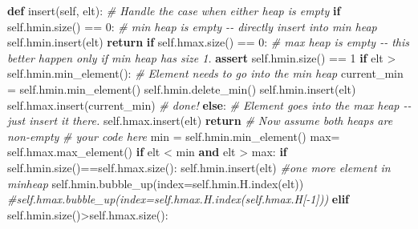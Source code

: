 \documentclass[
]{article}
\newenvironment{Shaded}{}{}
\newcommand{\BuiltInTok}[1]{\textcolor[rgb]{0.00,0.50,0.00}{#1}}
\newcommand{\CommentTok}[1]{\textcolor[rgb]{0.38,0.63,0.69}{\textit{#1}}}
\newcommand{\ControlFlowTok}[1]{\textcolor[rgb]{0.00,0.44,0.13}{\textbf{#1}}}
\newcommand{\DecValTok}[1]{\textcolor[rgb]{0.25,0.63,0.44}{#1}}
\newcommand{\KeywordTok}[1]{\textcolor[rgb]{0.00,0.44,0.13}{\textbf{#1}}}
\newcommand{\NormalTok}[1]{#1}
\newcommand{\OperatorTok}[1]{\textcolor[rgb]{0.40,0.40,0.40}{#1}}
\newcommand{\VariableTok}[1]{\textcolor[rgb]{0.10,0.09,0.49}{#1}}
\begin{document}
\begin{Shaded}
\begin{Highlighting}[]
    \KeywordTok{def}\NormalTok{ insert(}\VariableTok{self}\NormalTok{, elt):}
        \CommentTok{\# Handle the case when either heap is empty}
        \ControlFlowTok{if} \VariableTok{self}\NormalTok{.hmin.size() }\OperatorTok{==} \DecValTok{0}\NormalTok{:}
            \CommentTok{\# min heap is empty {-}{-} directly insert into min heap}
            \VariableTok{self}\NormalTok{.hmin.insert(elt)}
            \ControlFlowTok{return}
        \ControlFlowTok{if} \VariableTok{self}\NormalTok{.hmax.size() }\OperatorTok{==} \DecValTok{0}\NormalTok{:}
            \CommentTok{\# max heap is empty {-}{-} this better happen only if min heap has size 1.}
            \ControlFlowTok{assert} \VariableTok{self}\NormalTok{.hmin.size() }\OperatorTok{==} \DecValTok{1}
            \ControlFlowTok{if}\NormalTok{ elt }\OperatorTok{\textgreater{}} \VariableTok{self}\NormalTok{.hmin.min\_element():}
                \CommentTok{\# Element needs to go into the min heap}
\NormalTok{                current\_min }\OperatorTok{=} \VariableTok{self}\NormalTok{.hmin.min\_element()}
                \VariableTok{self}\NormalTok{.hmin.delete\_min()}
                \VariableTok{self}\NormalTok{.hmin.insert(elt)}
                \VariableTok{self}\NormalTok{.hmax.insert(current\_min)}
                \CommentTok{\# done!}
            \ControlFlowTok{else}\NormalTok{:}
                \CommentTok{\# Element goes into the max heap {-}{-} just insert it there.}
                \VariableTok{self}\NormalTok{.hmax.insert(elt)}
            \ControlFlowTok{return}
        \CommentTok{\# Now assume both heaps are non{-}empty}
        \CommentTok{\# your code here}
        \BuiltInTok{min} \OperatorTok{=} \VariableTok{self}\NormalTok{.hmin.min\_element()}
        \BuiltInTok{max}\OperatorTok{=} \VariableTok{self}\NormalTok{.hmax.max\_element()}
        \ControlFlowTok{if}\NormalTok{ elt }\OperatorTok{\textless{}} \BuiltInTok{min} \KeywordTok{and}\NormalTok{ elt }\OperatorTok{\textgreater{}} \BuiltInTok{max}\NormalTok{:}
          \ControlFlowTok{if} \VariableTok{self}\NormalTok{.hmin.size()}\OperatorTok{==}\VariableTok{self}\NormalTok{.hmax.size():}
            \VariableTok{self}\NormalTok{.hmin.insert(elt) }\CommentTok{\#one more element in minheap}
            \VariableTok{self}\NormalTok{.hmin.bubble\_up(index}\OperatorTok{=}\VariableTok{self}\NormalTok{.hmin.H.index(elt))}
            \CommentTok{\#self.hmax.bubble\_up(index=self.hmax.H.index(self.hmax.H[{-}1]))}
          \ControlFlowTok{elif} \VariableTok{self}\NormalTok{.hmin.size()}\OperatorTok{\textgreater{}}\VariableTok{self}\NormalTok{.hmax.size():}

\end{Highlighting}
\end{Shaded}
\end{document}
